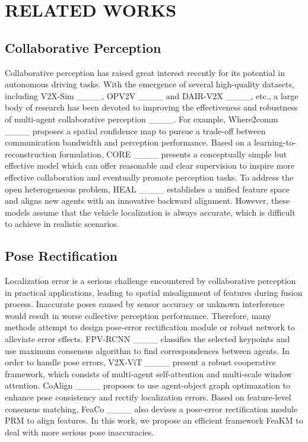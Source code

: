 \section{RELATED WORKS}
\subsection{Collaborative Perception}
    Collaborative perception has raised great interest recently for its potential in autonomous driving tasks. With the emergence of several high-quality datasets, including V2X-Sim ____, OPV2V ____ and DAIR-V2X ____, etc., a large body of research has been devoted to improving the effectiveness and robustness of multi-agent collaborative perception ____. For example, Where2comm ____ proposes a spatial confidence map to pursue a trade-off between communication bandwidth and perception performance. Based on a learning-to-reconstruction formulation, CORE ____ presents a conceptually simple but effective model which can offer reasonable and clear supervision to inspire more effective collaboration and eventually promote perception tasks. To address the open heterogeneous problem, HEAL ____ establishes a unified feature space and aligns new agents with an innovative backward alignment. However, these models assume that the vehicle localization is always accurate, which is difficult to achieve in realistic scenarios.

\subsection{Pose Rectification}
    Localization error is a serious challenge encountered by collaborative perception in practical applications, leading to spatial misalignment of features during fusion process. Inaccurate poses caused by sensor accuracy or unknown interference would result in worse collective perception performance. Therefore, many methods attempt to design pose-error rectification module or robust network to alleviate error effects. FPV-RCNN ____ classifies the selected keypoints and use maximum consensus algorithm to find correspondences between agents. In order to handle pose errors, V2X-ViT ____ present a robust cooperative framework, which consists of multi-agent self-attention and multi-scale window attention. CoAlign ____ proposes to use agent-object graph optimazation to enhance pose consistency and rectify localization errors. Based on feature-level consensus matching, FeaCo ____ also devises a pose-error rectification module PRM to align features. In this work, we propose an efficient framework FeaKM to deal with more serious pose inaccuracies.

